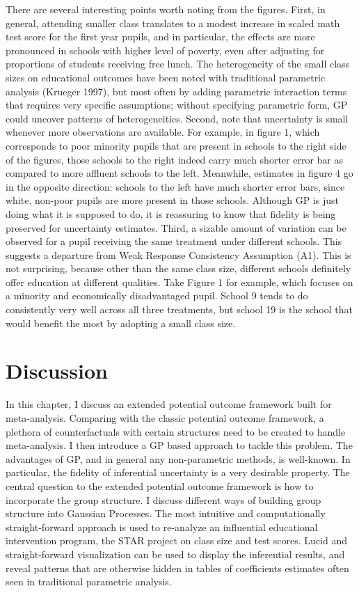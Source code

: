 There are several interesting points worth noting from the figures.
First, in general, attending smaller class translates to a modest
increase in scaled math test score for the first year pupils, and in
particular, the effects are more pronounced in schools with higher level
of poverty, even after adjusting for proportions of students receiving
free lunch. The heterogeneity of the small class sizes on educational
outcomes have been noted with traditional parametric analysis (Krueger
1997), but most often by adding parametric interaction terms that
requires very specific assumptions; without specifying parametric form,
GP could uncover patterns of heterogeneities. Second, note that
uncertainty is small whenever more observations are available. For
example, in figure 1, which corresponds to poor minority pupils that are
present in schools to the right side of the figures, those schools to
the right indeed carry much shorter error bar as compared to more
affluent schools to the left. Meanwhile, estimates in figure 4 go in the
opposite direction: schools to the left have much shorter error bars,
since white, non-poor pupils are more present in those schools. Although
GP is just doing what it is supposed to do, it is reassuring to know
that fidelity is being preserved for uncertainty estimates. Third, a
sizable amount of variation can be observed for a pupil receiving the
same treatment under different schools. This suggests a departure from
Weak Response Consistency Assumption (A1). This is not surprising,
because other than the same class size, different schools definitely
offer education at different qualities. Take Figure 1 for example, which
focuses on a minority and economically disadvantaged pupil. School 9
tends to do consistently very well across all three treatments, but
school 19 is the school that would benefit the most by adopting a small
class size.

\section{Discussion}\label{discussion}

In this chapter, I discuss an extended potential outcome framework built
for meta-analysis. Comparing with the classic potential outcome
framework, a plethora of counterfactuals with certain structures need to
be created to handle meta-analysis. I then introduce a GP based approach
to tackle this problem. The advantages of GP, and in general any
non-parametric methods, is well-known. In particular, the fidelity of
inferential uncertainty is a very desirable property. The central
question to the extended potential outcome framework is how to
incorporate the group structure. I discuss different ways of building
group structure into Gaussian Processes. The most intuitive and
computationally straight-forward approach is used to re-analyze an
influential educational intervention program, the STAR project on class
size and test scores. Lucid and straight-forward visualization can be
used to display the inferential results, and reveal patterns that are
otherwise hidden in tables of coefficients estimates often seen in
traditional parametric analysis.

